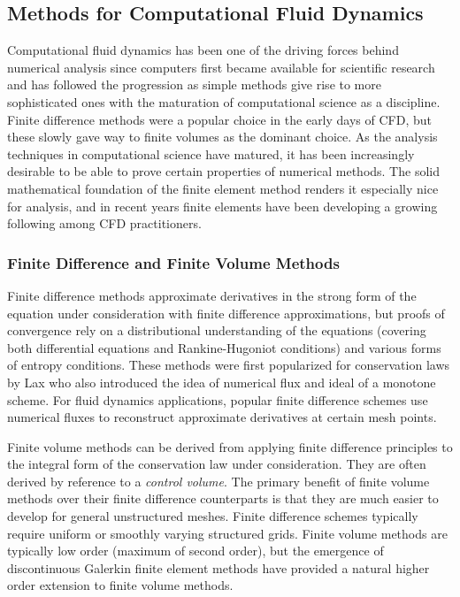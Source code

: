 \documentclass[Dissertation.tex]{subfiles}
\begin{document}
\subsection{Methods for Computational Fluid Dynamics}
Computational fluid dynamics has been one of the driving forces behind numerical analysis since computers first became available for
scientific research and has followed the progression as simple methods give rise to more sophisticated ones with the maturation of computational
science as a discipline.
Finite difference methods were a popular choice in the early days of CFD, but these slowly gave way to finite volumes as the dominant choice.
As the analysis techniques in computational science have matured, it has been increasingly desirable to be able to prove certain properties of
numerical methods.
The solid mathematical foundation of the finite element method renders it especially nice for analysis, and in recent years finite elements have
been developing a growing following among CFD practitioners.

\subsubsection{Finite Difference and Finite Volume Methods}
Finite difference methods approximate derivatives in the strong form of the equation under consideration with finite difference approximations,
but proofs of convergence rely on a distributional understanding of the equations (covering both differential equations and Rankine-Hugoniot conditions)
and various forms of entropy conditions.
These methods were first popularized for conservation laws by Lax who also introduced the idea of numerical flux and ideal of a monotone scheme.
For fluid dynamics applications, popular finite difference schemes use numerical fluxes to reconstruct approximate derivatives at certain mesh points.

Finite volume methods can be derived from applying finite difference principles to the integral form of the conservation law under consideration.
They are often derived by reference to a \emph{control volume}.
The primary benefit of finite volume methods over their finite difference counterparts is that they are much easier to develop for general unstructured meshes.
Finite difference schemes typically require uniform or smoothly varying structured grids.
Finite volume methods are typically low order (maximum of second order), but the emergence of discontinuous Galerkin finite element methods
have provided a natural higher order extension to finite volume methods.
\end{document}
